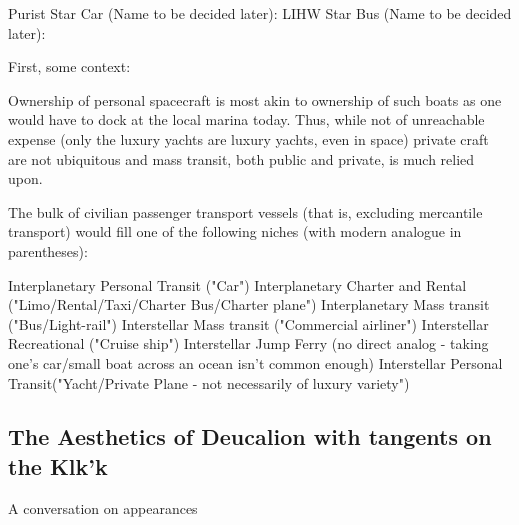 Purist Star Car (Name to be decided later):
LIHW Star Bus (Name to be decided later):

First, some context:

Ownership of personal spacecraft is most akin to ownership of such boats as one would have to dock at the local marina today. Thus, while not of unreachable expense (only the luxury yachts are luxury yachts, even in space) private craft are not ubiquitous and mass transit, both public and private, is much relied upon.

The bulk of civilian passenger transport vessels (that is, excluding mercantile transport) would fill one of the following niches (with modern analogue in parentheses):

Interplanetary Personal Transit ("Car")
Interplanetary Charter and Rental ("Limo/Rental/Taxi/Charter Bus/Charter plane")
Interplanetary Mass transit ("Bus/Light-rail")
Interstellar Mass transit ("Commercial airliner")
Interstellar Recreational ("Cruise ship")
Interstellar Jump Ferry (no direct analog - taking one's car/small boat across an ocean isn't common enough)
Interstellar Personal Transit("Yacht/Private Plane - not necessarily of luxury variety")


\subsection{The Aesthetics of Deucalion with tangents on the Klk'k}
A conversation on appearances

